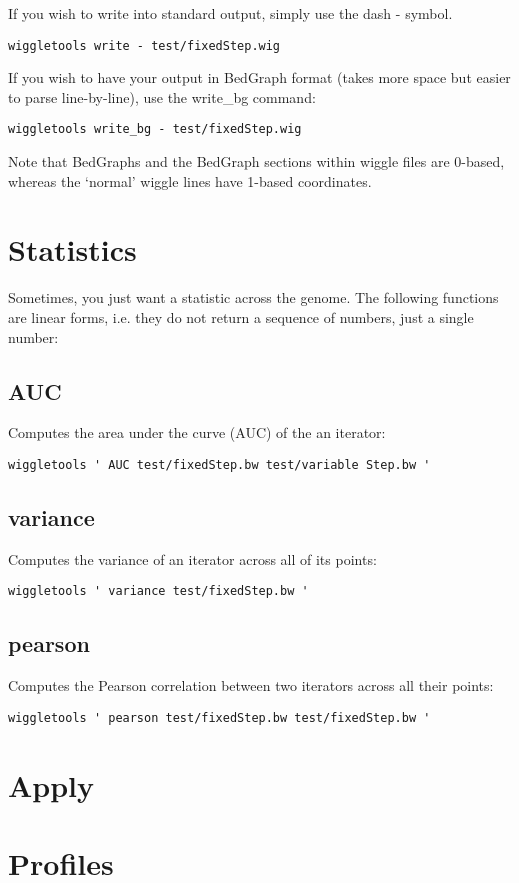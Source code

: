 \documentclass[12pt]{article}
\begin{document}
If you wish to write into standard output, simply use the dash - symbol.

\begin{verbatim}
wiggletools write - test/fixedStep.wig 
\end{verbatim}

If you wish to have your output in BedGraph format (takes more space but easier to parse line-by-line), use the write\_bg command:

\begin{verbatim}
wiggletools write_bg - test/fixedStep.wig 
\end{verbatim}

Note that BedGraphs and the BedGraph sections within wiggle files are 0-based, whereas the `normal' wiggle lines have 1-based coordinates.

\section{Statistics}

Sometimes, you just want a statistic across the genome. The following functions are linear forms, i.e. they do not return a sequence of numbers, just a single number:

\subsection{AUC}

Computes the area under the curve (AUC) of the an iterator:

\begin{verbatim}
wiggletools ' AUC test/fixedStep.bw test/variable Step.bw '
\end{verbatim}

\subsection{variance}

Computes the variance of an iterator across all of its points:

\begin{verbatim}
wiggletools ' variance test/fixedStep.bw '
\end{verbatim}

\subsection{pearson}

Computes the Pearson correlation between two iterators across all their points:

\begin{verbatim}
wiggletools ' pearson test/fixedStep.bw test/fixedStep.bw '
\end{verbatim}

\section{Apply}

\section{Profiles}
\end{document}
